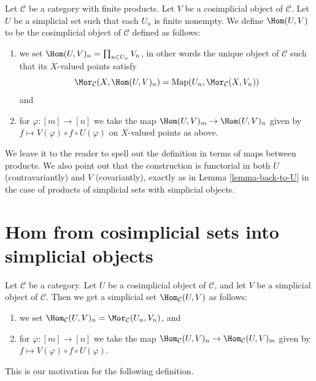 \begin{definition}
\label{definition-hom-deltak-cosimplicial}
Let $\mathcal{C}$ be a category with finite products.
Let $V$ be a cosimplicial object of $\mathcal{C}$.
Let $U$ be a simplicial set such that each
$U_n$ is finite nonempty.
We define {\it $\Hom(U, V)$} to be
the cosimplicial object of $\mathcal{C}$ defined
as follows:
\begin{enumerate}
\item we set $\Hom(U, V)_n = \prod_{u \in U_n} V_n$,
in other words the unique object of $\mathcal{C}$ such
that its $X$-valued points satisfy
$$
\Mor_\mathcal{C}(X, \Hom(U, V)_n)
=
\text{Map}(U_n, \Mor_\mathcal{C}(X, V_n))
$$
and
\item for $\varphi : [m] \to [n]$ we take the map
$\Hom(U, V)_m \to \Hom(U, V)_n$
given by $f \mapsto V(\varphi) \circ f \circ U(\varphi)$
on $X$-valued points as above.
\end{enumerate}
\end{definition}

\noindent
We leave it to the reader to spell out the
definition in terms of maps between products.
We also point out that the construction is functorial
in both $U$ (contravariantly) and $V$ (covariantly), exactly as in
Lemma \ref{lemma-back-to-U} in the case of
products of simplicial sets with simplicial objects.




\section{Hom from cosimplicial sets into simplicial objects}
\label{section-hom-from-cosimplicial-sets-into-simplicial}

\noindent
Let $\mathcal{C}$ be a category. Let $U$ be a cosimplicial object of
$\mathcal{C}$, and let $V$ be a simplicial object of $\mathcal{C}$.
Then we get a simplicial set $\Hom_\mathcal{C}(U, V)$ as follows:
\begin{enumerate}
\item we set
$\Hom_\mathcal{C}(U, V)_n = \Mor_\mathcal{C}(U_n, V_n)$, and
\item for $\varphi : [m] \to [n]$ we take the map
$\Hom_\mathcal{C}(U, V)_n \to \Hom_\mathcal{C}(U, V)_m$
given by $f \mapsto V(\varphi) \circ f \circ U(\varphi)$.
\end{enumerate}
This is our motivation for the following definition.

